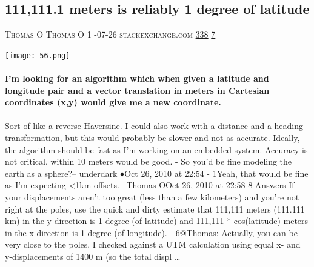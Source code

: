 \documentclass[10pt,a4paper]{article}
\begin{document}
\begin{multicols}{2}
\begin{minipage}{\linewidth}
\subsection{111,111.1 meters is reliably 1 degree of latitude}
\textsc{\footnotesize
{\scriptsize\faUser}\space 
Thomas O Thomas O 1 
{\scriptsize\faCalendar}-07-26 
{\scriptsize\faGlobe}\space 
stackexchange.com 
{\scriptsize\faThumbsOUp}\space 
\href{http://news.ycombinator.com/item?id=37284487\&utm\_term=comment}{338} 
{\scriptsize\faComments}\space 
\href{http://news.ycombinator.com/item?id=37284487\&utm\_term=comment}{7} 
}
\par\medskip\noindent
\href{https://gis.stackexchange.com/a/2964/5599?utm\_source=hackernewsletter\&utm\_medium=email\&utm\_term=learn}{
    \texttt{[image: 56.png]}
}
\end{minipage}
\paragraph{}
\textbf{I'm looking for an algorithm which when given a latitude and longitude pair and a vector translation in meters in Cartesian coordinates (x,y) would give me a new coordinate.}
\paragraph{}
 Sort of like a reverse Haversine. I could also work with a distance and a heading transformation, but this would probably be slower and not as accurate. Ideally, the algorithm should be fast as I'm working on an embedded system. Accuracy is not critical, within 10 meters would be good.
-
So you'd be fine modeling the earth as a sphere?– underdark ♦Oct 26, 2010 at 22:54
-
1Yeah, that would be fine as I'm expecting <1km offsets.– Thomas OOct 26, 2010 at 22:58
8 Answers
If your displacements aren't too great (less than a few kilometers) and you're not right at the poles, use the quick and dirty estimate that 111,111 meters (111.111 km) in the y direction is 1 degree (of latitude) and 111,111 * cos(latitude) meters in the x direction is 1 degree (of longitude).
-
6@Thomas: Actually, you can be very close to the poles. I checked against a UTM calculation using equal x- and y-displacements of 1400 m (so the total displ
\dots\par
\noindent\begin{minipage}{\linewidth}
\medskip

\end{minipage}
\end{multicols}
\end{document}
